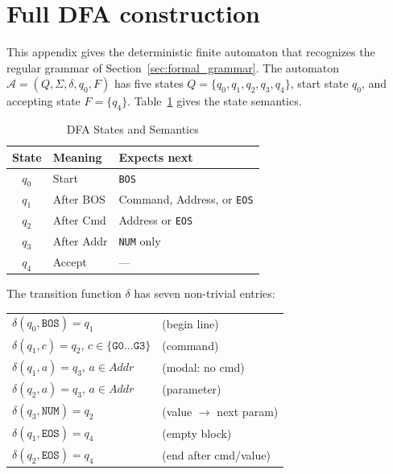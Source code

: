 \documentclass[sensors,article,submit,moreauthors,pdftex]{Definitions/mdpi}
\begin{document}
{\small

}

\appendix

\section{Full DFA construction}
\label{sec:dfa_construction}

This appendix gives the deterministic finite automaton that recognizes the regular grammar of Section~\ref{sec:formal_grammar}. The automaton $\mathcal{A} = (Q, \Sigma, \delta, q_0, F)$ has five states $Q = \{q_0, q_1, q_2, q_3, q_4\}$, start state $q_0$, and accepting state $F = \{q_4\}$. Table~\ref{tab:dfa_states} gives the state semantics.

\begin{table}[htbp]
\centering
\caption{DFA States and Semantics}
\label{tab:dfa_states}
\small
\begin{tabular}{@{}cll@{}}
\toprule
\textbf{State} & \textbf{Meaning} & \textbf{Expects next} \\
\midrule
$q_0$ & Start        & \texttt{BOS} \\
$q_1$ & After BOS    & Command, Address, or \texttt{EOS} \\
$q_2$ & After Cmd    & Address or \texttt{EOS} \\
$q_3$ & After Addr   & \texttt{NUM} only \\
$q_4$ & Accept       & --- \\
\bottomrule
\end{tabular}
\end{table}

The transition function $\delta$ has seven non-trivial entries:
\begin{center}
\small
\begin{tabular}{@{}ll@{}}
$\delta(q_0, \texttt{BOS}) = q_1$ & (begin line) \\
$\delta(q_1, c) = q_2$, $c \in \{\texttt{G0}\ldots\texttt{G3}\}$ & (command) \\
$\delta(q_1, a) = q_3$, $a \in \mathit{Addr}$ & (modal: no cmd) \\
$\delta(q_2, a) = q_3$, $a \in \mathit{Addr}$ & (parameter) \\
$\delta(q_3, \texttt{NUM}) = q_2$ & (value $\to$ next param) \\
$\delta(q_1, \texttt{EOS}) = q_4$ & (empty block) \\
$\delta(q_2, \texttt{EOS}) = q_4$ & (end after cmd/value) \\
\end{tabular}
\end{center}
\end{document}
